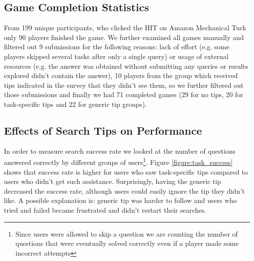 \documentclass{sig-alternate}
\begin{document}
\subsection{Game Completion Statistics}

From 199 unique participants, who clicked the HIT on Amazon Mechanical Turk only 90 players finished the game.
We further examined all games manually and filtered out 9 submissions for the following reasons: lack of effort (e.g. some players skipped several tasks after only a single query) or usage of external resources (e.g. the answer was obtained without submitting any queries or results explored didn't contain the answer), 
10 players from the group which received tips indicated in the survey that they didn't see them, so we further filtered out those submissions and finally we had 71 completed games (29 for no tips, 20 for task-specific tips and 22 for generic tip groups).

\vspace{-1mm}
\subsection{Effects of Search Tips on Performance}

In order to measure search success rate we looked at the number of questions answered correctly by different groups of users\footnote{Since users were allowed to skip a question we are counting the number of questions that were eventually solved correctly even if a player made some incorrect attempts}. Figure \ref{figure:task_success} shows that success rate is higher for users who saw task-specific tips compared to users who didn't get such assistance.
Surprisingly, having the generic tip decreased the success rate, although users could easily ignore the tip they didn't like.
A possible explanation is: generic tip was harder to follow and users who tried and failed became frustrated and didn't restart their searches.

\end{document}
